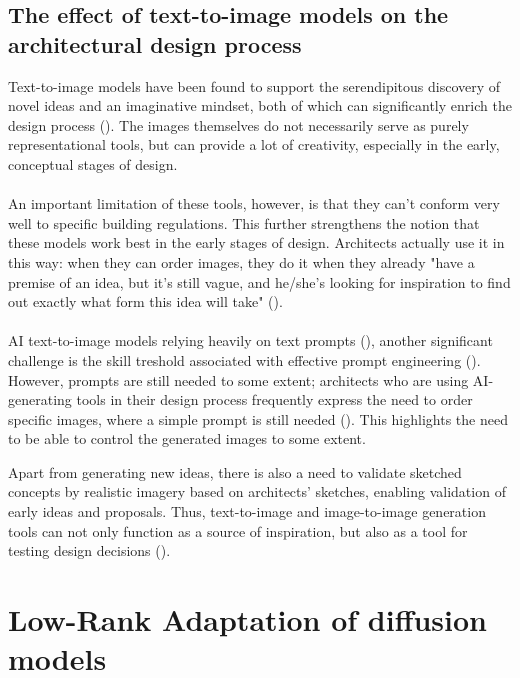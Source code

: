 \subsection{The effect of text-to-image models on the architectural design process}
Text-to-image models have been found to support the serendipitous discovery of novel ideas and an imaginative mindset, both of which can significantly enrich the design process (\cite{paananen_using_2024}). The images themselves do not necessarily serve as purely representational tools, but can provide a lot of creativity, especially in the early, conceptual stages of design.\\
\\
An important limitation of these tools, however, is that they can't conform very well to specific building regulations. This further strengthens the notion that these models work best in the early stages of design. Architects actually use it in this way: when they can order images, they do it when they already "have a premise of an idea, but it’s still vague, and he/she’s looking for inspiration to find out exactly what form this idea will take" (\cite{baudoux_benefits_2024}).\\
\\
AI text-to-image models relying heavily on text prompts (\cite{tan_using_2024}), another significant challenge is the skill treshold associated with effective prompt engineering (\cite{paananen_using_2024}). However, prompts are still needed to some extent; architects who are using AI-generating tools in their design process frequently express the need to order specific images, where a simple prompt is still needed (\cite{baudoux_benefits_2024}). This highlights the need to be able to control the generated images to some extent.

Apart from generating new ideas, there is also a need to validate sketched concepts by realistic imagery based on architects' sketches, enabling validation of early ideas and proposals. Thus, text-to-image and image-to-image generation tools can not only function as a source of inspiration, but also as a tool for testing design decisions (\cite{baudoux_benefits_2024}).

\section{Low-Rank Adaptation of diffusion models}

